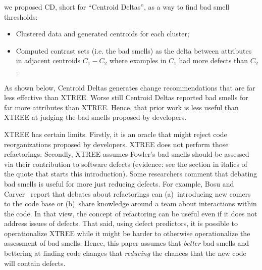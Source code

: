 \documentclass{sig-alternate}
\begin{document}
we proposed CD, short for
``Centroid Deltas'', as a way to find bad smell thresholds:
\begin{itemize}
    \item Clustered
data and generated centroids for each cluster;
\item Computed contrast sets (i.e. the bad smells)
as the delta between attributes in adjacent centroids $C_1 - C_2$
where examples in $C_1$ had more defects than $C_2$.
\end{itemize}
As shown below, Centroid Deltas
generates change
recommendations that are far less effective than XTREE.
Worse still Centroid Deltas reported bad smells
for far more attributes than XTREE. Hence, that prior work
is less useful than XTREE at judging the  bad smells proposed by developers.

 

XTREE   has certain limits. Firstly, it is an oracle that  might reject code reorganizations proposed
by developers. XTREE does not perform those refactorings.
Secondly, XTREE assumes   Fowler's bad smells
should be assessed via their contribution to software defects
(evidence: see the section in italics of the quote
that starts this introduction). Some researchers 
 comment that   debating bad smells is  useful for more just reducing defects. For example, Bosu and Carver~\cite{bosu13} report that
debates about refactorings can   (a)~introducing new comers to the code base or (b)~share knowledge around a team
about interactions within the code. In that view, 
the concept of refactoring can be useful
even if it does not address issues of defects. 
That said, using
defect predictors,
it is possible to operationalize XTREE
while it might be harder to otherwise operationalize the assessment of bad smells.
Hence, 
this paper assumes that {\em better} bad smells and
bettering at finding code changes that  {\em reducing} the chances
that the new code will contain defects. 
 
\end{document}
